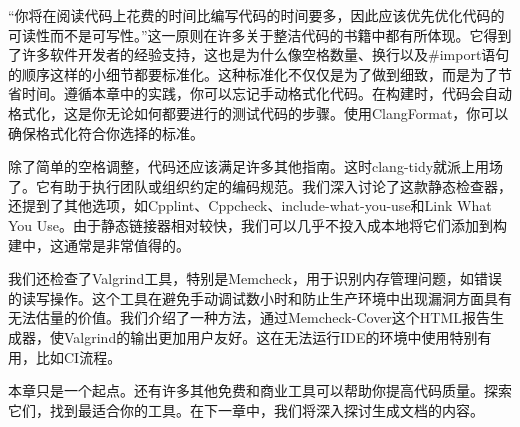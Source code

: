 “你将在阅读代码上花费的时间比编写代码的时间要多，因此应该优先优化代码的可读性而不是可写性。”这一原则在许多关于整洁代码的书籍中都有所体现。它得到了许多软件开发者的经验支持，这也是为什么像空格数量、换行以及\#import语句的顺序这样的小细节都要标准化。这种标准化不仅仅是为了做到细致，而是为了节省时间。遵循本章中的实践，你可以忘记手动格式化代码。在构建时，代码会自动格式化，这是你无论如何都要进行的测试代码的步骤。使用ClangFormat，你可以确保格式化符合你选择的标准。

除了简单的空格调整，代码还应该满足许多其他指南。这时clang-tidy就派上用场了。它有助于执行团队或组织约定的编码规范。我们深入讨论了这款静态检查器，还提到了其他选项，如Cpplint、Cppcheck、include-what-you-use和Link What You Use。由于静态链接器相对较快，我们可以几乎不投入成本地将它们添加到构建中，这通常是非常值得的。

我们还检查了Valgrind工具，特别是Memcheck，用于识别内存管理问题，如错误的读写操作。这个工具在避免手动调试数小时和防止生产环境中出现漏洞方面具有无法估量的价值。我们介绍了一种方法，通过Memcheck-Cover这个HTML报告生成器，使Valgrind的输出更加用户友好。这在无法运行IDE的环境中使用特别有用，比如CI流程。

本章只是一个起点。还有许多其他免费和商业工具可以帮助你提高代码质量。探索它们，找到最适合你的工具。在下一章中，我们将深入探讨生成文档的内容。